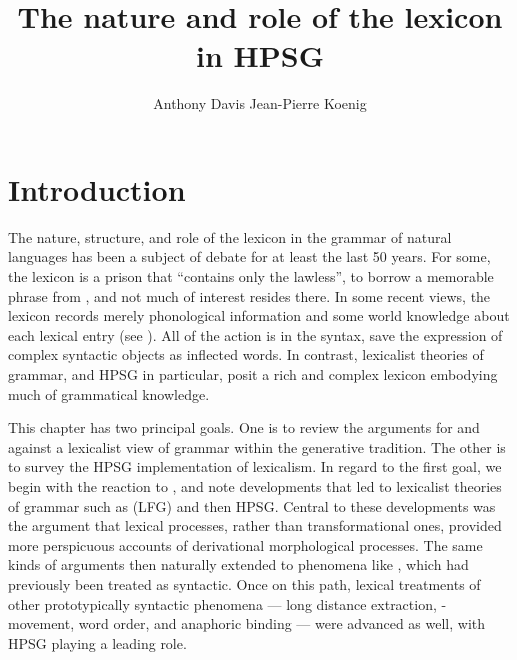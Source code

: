 \documentclass[output=paper
 	        ,biblatex
                ,babelshorthands
                ,newtxmath
                ,draftmode
                ,colorlinks, citecolor=brown
]{langscibook}
\author{%
Anthony Davis\affiliation{Southern Oregon University}%
\lastand Jean-Pierre Koenig\affiliation{University at Buffalo}%
}
\title{The nature and role of the lexicon in HPSG}
\begin{document}
\maketitle
\label{chap-lexicon}

\section{Introduction}


The nature, structure, and role of the lexicon in the grammar of natural languages has been a
subject of debate for at least the last 50 years. For some, the lexicon is a prison that ``contains
only the lawless'', to borrow a memorable phrase from , and not
much of interest resides there. In some recent views, the lexicon records merely phonological
information and some world knowledge about each lexical entry (see \citealt{Marantz1997}). All of
the action is in the syntax, save the expression of complex syntactic objects as inflected words.
In contrast, lexicalist theories of grammar, and HPSG in particular, posit a rich and complex
lexicon embodying much of grammatical knowledge.

This chapter has two principal goals.  One is to review the arguments for and against a lexicalist
view of grammar within the generative tradition.  The other is to survey the HPSG implementation of
lexicalism. In regard to the first goal, we begin with the reaction to ,
and note developments that led to lexicalist theories of grammar such as  (LFG) and then HPSG.  Central to these developments was the argument that lexical
processes, rather than transformational ones, provided more perspicuous accounts of derivational
morphological processes.  The same kinds of arguments then naturally extended to phenomena like
, which had previously been treated as syntactic.  Once on this path, lexical
treatments of other prototypically syntactic phenomena — long distance extraction,
-movement, word order, and anaphoric binding — were advanced as well, with HPSG playing a
leading role.
\end{document}
